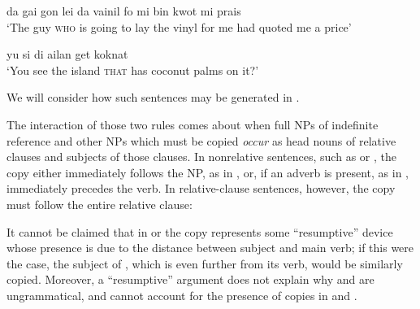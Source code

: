 \ea\label{ex:73}
 da gai gon lei da vainil fo mi bin kwot mi prais\\
\glt  `The guy \textsc{who} is going to lay the vinyl for me had quoted me a price'
\z

\ea\label{ex:74}
yu si di ailan get koknat\\
\glt `You see the island \textsc{that} has coconut palms on it?'
\z

\noindent We will consider how such sentences may be generated in .

The interaction of those two rules comes about when full NPs of indefinite reference and other NPs which must be copied \textit{occur} as head nouns of relative clauses and subjects of those clauses. In non\-relative sentences, such as  or , the copy either immediately follows the NP, as in , or, if an adverb is present, as in , immediately precedes the verb. In relative-clause sentences, however, the copy must follow the entire relative clause:

\z

\z

\z

\z

\z

\z

\z

\z

It cannot be claimed that in  or  the copy represents some ``resumptive'' device whose presence is due to the distance be\-tween subject and main verb; if this were the case, the subject of , which is even further from its verb, would be similarly copied. More\-over, a ``resumptive'' argument does not explain why  and  are ungrammatical, and cannot account for the presence of copies in
 and .

